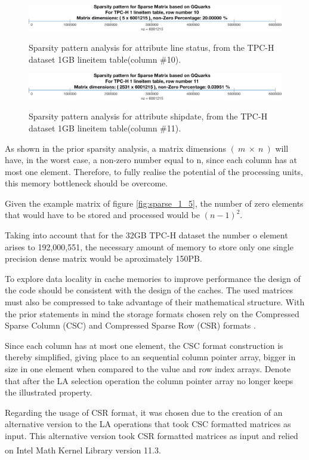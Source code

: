 \begin{figure}[H]
\centering
\caption{Sparsity pattern analysis for attribute line status, from the TPC-H dataset 1GB lineitem table(column \#10).}
\includegraphics[width=1\columnwidth]{eps/sparsity_10.png}
\label{fig:sparse_1_10}
\end{figure}
\vspace{1.5cm}

\begin{figure}[H]
\centering
\caption{Sparsity pattern analysis for attribute shipdate, from the TPC-H dataset 1GB lineitem table(column \#11).}
\includegraphics[width=1\columnwidth]{eps/sparsity_11.png}
\label{fig:sparse_1_11}
\end{figure}
\vspace{1.5cm}


As shown in the prior sparsity analysis, a matrix dimensions $(\ m\ \times\ n\ )$ will have, in the worst case, a non-zero number equal to n, since each column has at most one element. Therefore, to fully realise the potential of the processing units,  this memory bottleneck should be overcome.\par 
 Given the example matrix of figure \ref{fig:sparse_1_5}, the number of zero elements that would have to be stored and processed would be $(n-1)^2$. 
 
 Taking into account that for the 32GB TPC-H dataset  the number o element arises to 192,000,551, the necessary amount of memory to store only one single precision dense matrix would be  aproximately 150PB. \par 
 To explore data locality in cache memories to improve performance the design of the code should be consistent with the design of the caches. 
 The used matrices must also be compressed to take advantage of their mathematical structure. With the prior statements in mind the storage formats chosen  rely on the Compressed Sparse Column (CSC) and Compressed Sparse Row (CSR) formats \cite{silva2005sparse}. \par 
 Since each column has at most one element, the CSC format construction is thereby simplified, giving place to an sequential column pointer array, bigger in size in one element when compared to the value and row index arrays. Denote that after the LA selection operation the column pointer array no longer keeps the illustrated property. \par 
Regarding the usage of CSR format, it was chosen due to the creation of an alternative version to the LA operations that took CSC formatted matrices as input. This alternative version took CSR formatted matrices as input and relied on  Intel\textsuperscript{\textregistered} Math Kernel Library version 11.3.



